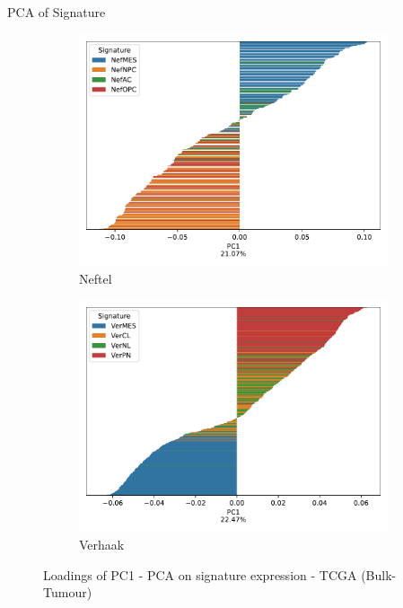 \documentclass[aspectratio=169,9pt]{beamer}
\begin{document}
    \begin{frame}{PCA of Signature}
        \begin{adjustwidth}{-5cm}{-5cm}
            \centering
            \begin{figure}\ContinuedFloat
                \centering
                \begin{subfigure}[c]{0.48\textwidth}
                    \centering
                    \includegraphics[width=\textwidth]{TCGA_loadings_barplot_Nef}
                    \caption{Neftel}
                \end{subfigure}
                \begin{subfigure}[c]{0.48\textwidth}
                    \centering
                    \includegraphics[width=\textwidth]{TCGA_loadings_barplot_Ver}
                    \caption{Verhaak}
                \end{subfigure}
                \caption{Loadings of PC1 - PCA on signature expression - TCGA (Bulk-Tumour)}
            \end{figure}
        \end{adjustwidth}
    \end{frame}
\end{document}
